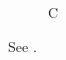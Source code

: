 \documentclass{aastex}
\begin{document}
\begin{figure}\caption{C}\label{f}\end{figure}
See .
\end{document}
